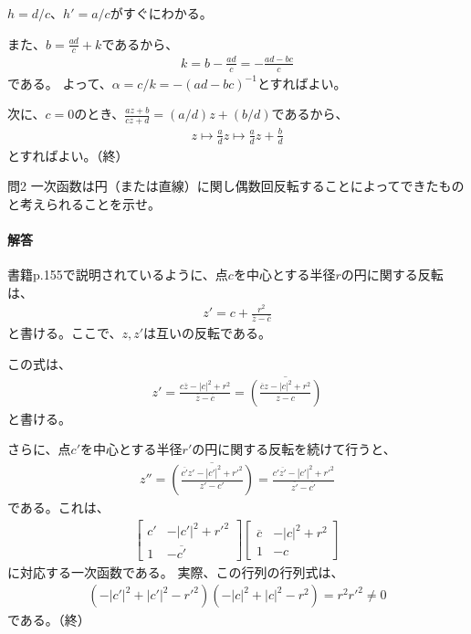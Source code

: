 $h=d/c$、$h'=a/c$がすぐにわかる。

また、$b=\frac{ad}{c}+k$であるから、
\begin{align*}
    k=b-\frac{ad}{c}=-\frac{ad-bc}{c}
\end{align*}
である。
よって、$\alpha=c/k=-(ad-bc)^{-1}$とすればよい。

次に、$c=0$のとき、$\frac{az+b}{cz+d}=(a/d)z+(b/d)$であるから、
\begin{align*}
    z\mapsto \frac{a}{d}z\mapsto \frac{a}{d}z+\frac{b}{d}
\end{align*}
とすればよい。（終）

\newpage
\begin{mysimplebox}{問2}
    一次函数は円（または直線）に関し偶数回反転することによってできたものと考えられることを示せ。
\end{mysimplebox}
\paragraph{解答}
書籍p.155で説明されているように、点$c$を中心とする半径$r$の円に関する反転は、
\begin{align*}
    z'=c+\frac{r^2}{\overline{z}-\overline{c}}
\end{align*}
と書ける。ここで、$z,z'$は互いの反転である。

この式は、
\begin{align*}
    z'=\frac{c\overline{z}-|c|^2+r^2}{\overline{z}-\overline{c}}
    =\overline{\left(\frac{\overline{c}z-|c|^2+r^2}{z-c}\right)}
\end{align*}
と書ける。

さらに、点$c'$を中心とする半径$r'$の円に関する反転を続けて行うと、
\begin{align*}
    z''=\overline{\left(\frac{\overline{c'}z'-|c'|^2+r'^2}{z'-c'}\right)}
    =\frac{c'\overline{z'}-|c'|^2+r'^2}{\overline{z'}-\overline{c'}}
\end{align*}
である。これは、
\begin{align*}
    \begin{bmatrix}
        c'&-|c'|^2+r'^2\\
        1&-\overline{c'}
    \end{bmatrix}
    \begin{bmatrix}
        \overline{c}&-|c|^2+r^2\\
        1&-c
    \end{bmatrix}
\end{align*}
に対応する一次函数である。
実際、この行列の行列式は、
\begin{align*}
    (-|c'|^2+|c'|^2-r'^2)(-|c|^2+|c|^2-r^2)=r^2r'^2\neq0
\end{align*}
である。（終）

